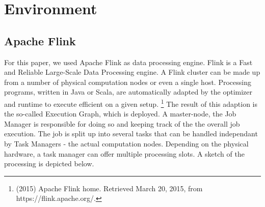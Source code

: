 \section{Environment}
\subsection{Apache Flink}
For this paper, we used Apache Flink as data processing engine. Flink is a Fast and Reliable
Large-Scale Data Processing engine. A Flink cluster can be made up from a number of physical
computation nodes or even a single host. Processing programs, written in Java or Scala, are
automatically adapted by the optimizer and runtime to execute efficient on a given setup.
\footnote{(2015) Apache Flink home. Retrieved March 20, 2015, from https://flink.apache.org/.}
The result of this adaption is the so-called Execution Graph, which is deployed. A master-node, the
Job Manager is responsible for doing so and keeping track of the the overall job execution. The job
is split up into several tasks that can be handled independant by Task Managers - the actual
computation nodes.  Depending on the physical hardware, a task manager can offer multiple processing
slots. A sketch of the processing is depicted below.

